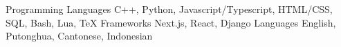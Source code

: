 

\begin{cvskills}

\cvskill
  {Programming Languages} %
  {C++, Python, Javascript/Typescript, HTML/CSS, SQL, Bash, Lua, \TeX{}} %
\cvskill
  {Frameworks} %
  {Next.js, React, Django} %
\cvskill
  {Languages} %
  {English, Putonghua, Cantonese, Indonesian} %

\end{cvskills}
